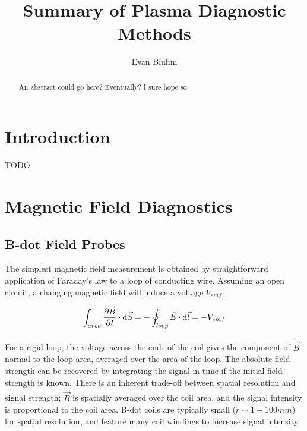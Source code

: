 \documentclass{jpp}
\title{Summary of Plasma Diagnostic Methods}
\author{Evan Bluhm}
\begin{document}
\maketitle

\begin{abstract}
An abstract could go here? Eventually? I sure hope so.
\end{abstract}

\section{Introduction}

{\Large TODO \par}

\section{Magnetic Field Diagnostics}

\subsection{B-dot Field Probes}

The simplest magnetic field measurement is obtained by straightforward application of Faraday's law to a loop of conducting wire. Assuming an open circuit, a changing magnetic field will induce a voltage $V_{emf}$ :

\begin{equation*}
\int_{area} \pdv{\vec B}{t} \cdot \dd \vec S = - \oint _{loop} \vec E \cdot \dd \vec l = - V_{emf}
\end{equation*}

For a rigid loop, the voltage across the ends of the coil gives the component of $\dot{\vec B}$ normal to the loop area, averaged over the area of the loop. The absolute field strength can be recovered by integrating the signal in time if the initial field strength is known. There is an inherent trade-off between spatial resolution and signal strength; $\dot{\vec B}$ is spatially averaged over the coil area, and the signal intensity is proportional to the coil area. B-dot coils are typically small ($r \sim 1-100 mm$) for spatial resolution, and feature many coil windings to increase signal intensity.
\end{document}
